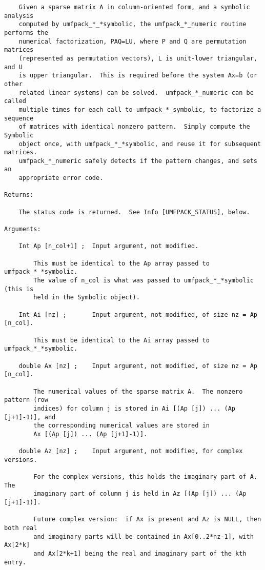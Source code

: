 {\begin{verbatim}
    Given a sparse matrix A in column-oriented form, and a symbolic analysis
    computed by umfpack_*_*symbolic, the umfpack_*_numeric routine performs the
    numerical factorization, PAQ=LU, where P and Q are permutation matrices
    (represented as permutation vectors), L is unit-lower triangular, and U
    is upper triangular.  This is required before the system Ax=b (or other
    related linear systems) can be solved.  umfpack_*_numeric can be called
    multiple times for each call to umfpack_*_symbolic, to factorize a sequence
    of matrices with identical nonzero pattern.  Simply compute the Symbolic
    object once, with umfpack_*_*symbolic, and reuse it for subsequent matrices.
    umfpack_*_numeric safely detects if the pattern changes, and sets an
    appropriate error code.

Returns:

    The status code is returned.  See Info [UMFPACK_STATUS], below.

Arguments:

    Int Ap [n_col+1] ;  Input argument, not modified.

        This must be identical to the Ap array passed to umfpack_*_*symbolic.
        The value of n_col is what was passed to umfpack_*_*symbolic (this is
        held in the Symbolic object).

    Int Ai [nz] ;       Input argument, not modified, of size nz = Ap [n_col].

        This must be identical to the Ai array passed to umfpack_*_*symbolic.

    double Ax [nz] ;    Input argument, not modified, of size nz = Ap [n_col].

        The numerical values of the sparse matrix A.  The nonzero pattern (row
        indices) for column j is stored in Ai [(Ap [j]) ... (Ap [j+1]-1)], and
        the corresponding numerical values are stored in
        Ax [(Ap [j]) ... (Ap [j+1]-1)].

    double Az [nz] ;    Input argument, not modified, for complex versions.

        For the complex versions, this holds the imaginary part of A.  The
        imaginary part of column j is held in Az [(Ap [j]) ... (Ap [j+1]-1)].

        Future complex version:  if Ax is present and Az is NULL, then both real
        and imaginary parts will be contained in Ax[0..2*nz-1], with Ax[2*k]
        and Ax[2*k+1] being the real and imaginary part of the kth entry.


\end{verbatim}}

